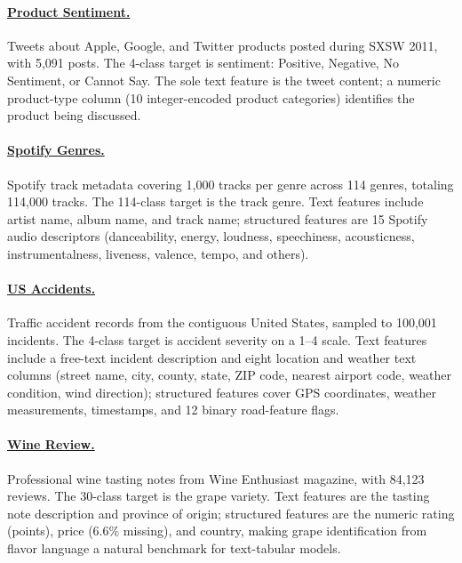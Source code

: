 \paragraph{\href{https://www.openml.org/search?type=data&id=46651}{Product Sentiment.}} Tweets about Apple, Google, and Twitter products posted during SXSW 2011, with 5,091 posts.
The 4-class target is sentiment: Positive, Negative, No Sentiment, or Cannot Say.
The sole text feature is the tweet content; a numeric product-type column (10 integer-encoded product categories) identifies the product being discussed.

\paragraph{\href{https://www.kaggle.com/datasets/maharshipandya/-spotify-tracks-dataset}{Spotify Genres.}} Spotify track metadata covering 1,000 tracks per genre across 114 genres, totaling 114,000 tracks.
The 114-class target is the track genre.
Text features include artist name, album name, and track name; structured features are 15 Spotify audio descriptors (danceability, energy, loudness, speechiness, acousticness, instrumentalness, liveness, valence, tempo, and others).

\paragraph{\href{https://www.kaggle.com/datasets/sobhanmoosavi/us-accidents}{US Accidents.}}
Traffic accident records from the contiguous United States, sampled to 100,001 incidents.
The 4-class target is accident severity on a 1--4 scale.
Text features include a free-text incident description and eight location and weather text columns (street name, city, county, state, ZIP code, nearest airport code, weather condition, wind direction); structured features cover GPS coordinates, weather measurements, timestamps, and 12 binary road-feature flags.

\paragraph{\href{https://www.openml.org/search?type=data&id=46653}{Wine Review.}}
Professional wine tasting notes from Wine Enthusiast magazine, with 84,123 reviews.
The 30-class target is the grape variety.
Text features are the tasting note description and province of origin; structured features are the numeric rating (points), price (6.6\% missing), and country, making grape identification from flavor language a natural benchmark for text-tabular models.

